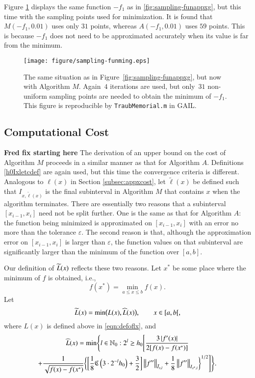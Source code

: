 \documentclass[review]{elsarticle}
\newcommand{\abstol}{\varepsilon}
\theoremstyle{definition}
\newcommand{\tell}{\tilde{\ell}}
\newcommand{\chL}{\widehat{L}}
\begin{document}
Figure \ref{fig:sampling-funming} displays the same function $-f_1$ as in
\ref{fig:sampling-funappxg}, but this time with the sampling points used for
minimization. It is found that $M(-f_1,0.01)$ uses only $31$ points, whereas
$A(-f_1,0.01)$ uses $59$ points. This is because $-f_1$ does not need to be
approximated accurately when its value is far from the minimum.


\begin{figure}[tbh]
\centering
\texttt{[image: figure/sampling-funming.eps]}
\caption{The same situation as in Figure~\ref{fig:sampling-funappxg}, but now
with Algorithm $M$. Again~$4$ iterations are used, but only~$31$ non-uniform
sampling points are needed to obtain the minimum of $-f_1$. This figure is
reproducible by {\tt TraubMemorial.m} in GAIL.} \label{fig:sampling-funming}
\end{figure}

\subsection{Computational Cost} \label{subsec:optcost} \textbf{Fred fix starting here}
The derivation of an upper bound on the cost of Algorithm $M$ proceeds in a
similar manner as that for Algorithm $A$. Definitions \eqref{h0Ixletcdef} are
again used, but this time the convergence criteria is different. Analogous to
$\ell(x)$ in Section \ref{subsec:appxcost}, let $\tell(x)$ be defined such that
$I_{x,\tell(x)}$ is the final subinterval in Algorithm $M$ that contains $x$
when the algorithm terminates. There are essentially two reasons that a
subinterval $[x_{i-1},x_i]$ need not be split further. One is the same as that
for Algorithm $A$: the function being minimized is approximated on
$[x_{i-1},x_i]$ with an error no more than the tolerance $\abstol$. The second
reason is that, although the approximation error on $[x_{i-1},x_i]$ is larger
than $\abstol$, the function values on that subinterval are significantly larger
than the minimum of the function over $[a,b]$.

Our definition of $\widetilde{L}(x)$ reflects these two reasons. Let $x^*$ be some place
where the minimum of $f$ is obtained, i.e.,
\[
f(x^*)  = \min_{a \le x \le b} f(x).
\]
Let
\begin{equation}\label{eqn:defofltx}
\tL(x) = \min\bigl(L(x),\chL(x)\bigr), \qquad x \in [a,b[,
\end{equation}
where $L(x)$ is defined above in \eqref{eqn:defoflx}, and
\begin{multline}\label{eqn:defoflt1x}
\chL(x) = \min \Biggl\{ l \in \mathbb{N}_0 :  2^l \ge h_0 \Biggl[ \frac{3\abs{f'(x)}}{2[f(x) - f(x^*)]} \\
+  \frac{1}{\sqrt{f(x) - f(x^*)}} \biggl\{ \biggl[\frac 18 \fC\left(3\cdot2^{-l}h_0\right) + \frac 32 \biggr]   \norm[\bar{I}_{x,l}]{f''}
+ \frac18\norm[{I_{x^*,l}}]{f''} \biggr\}^{1/2} \Biggr] \Biggr\}.
\end{multline}
\end{document}
